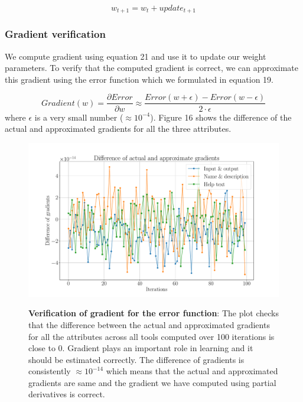 \begin{equation}
w_{t+1} = w_t + update_{t+1}
\end{equation}

\subsubsection{Gradient verification}
We compute gradient using equation 21 and use it to update our weight parameters. To verify that the computed gradient is correct, we can approximate this gradient using the error function which we formulated in equation 19.

\begin{equation}
Gradient(w) = \frac{\partial Error}{\partial w} \approx \frac{Error(w + \epsilon) - Error(w - \epsilon)}{2 \cdot \epsilon} 
\end{equation}
where $\epsilon$ is a very small number ($\approx10^{-4}$). Figure 16 shows the difference of the actual and approximated gradients for all the three attributes.

\begin{figure}[h]
\begin{centering}
    {\includegraphics[scale=0.35]{figures/Difference_gradients.pdf}}
    \caption[Verification of gradient for the error function]{\textbf{Verification of gradient for the error function}: The plot checks that the difference between the actual and approximated gradients for all the attributes across all tools computed over 100 iterations is close to 0. Gradient plays an important role in learning and it should be estimated correctly. The difference of gradients is consistently $\approx 10^{-14}$ which means that the actual and approximated gradients are same and the gradient we have computed using partial derivatives is correct.}
\end{centering}
\end{figure}